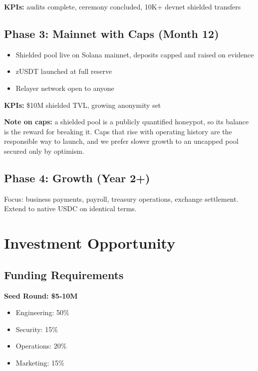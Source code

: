 \documentclass[11pt,a4paper]{article}
\begin{document}
\textbf{KPIs:} audits complete, ceremony concluded, 10K+ devnet shielded transfers

\subsection{Phase 3: Mainnet with Caps (Month 12)}

\begin{itemize}[leftmargin=*]
    \item Shielded pool live on Solana mainnet, deposits capped and raised on evidence
    \item zUSDT launched at full reserve
    \item Relayer network open to anyone
\end{itemize}

\textbf{KPIs:} \$10M shielded TVL, growing anonymity set

\textbf{Note on caps:} a shielded pool is a publicly quantified honeypot, so its balance is the reward for breaking it. Caps that rise with operating history are the responsible way to launch, and we prefer slower growth to an uncapped pool secured only by optimism.

\subsection{Phase 4: Growth (Year 2+)}

Focus: business payments, payroll, treasury operations, exchange settlement. Extend to native USDC on identical terms.

\section{Investment Opportunity}

\subsection{Funding Requirements}

\textbf{Seed Round: \$5-10M}
\begin{itemize}[leftmargin=*]
    \item Engineering: 50\%
    \item Security: 15\%
    \item Operations: 20\%
    \item Marketing: 15\%
\end{itemize}
\end{document}
